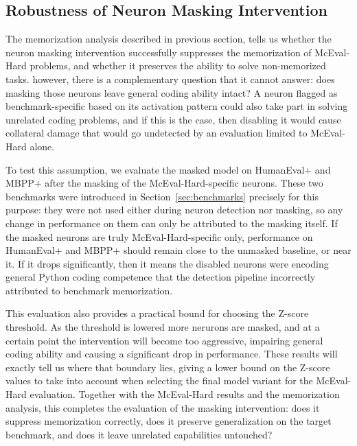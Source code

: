 \documentclass[mscthesis]{usiinfthesis}
\begin{document}
\subsection{Robustness of Neuron Masking Intervention}
\label{sec:robustness_design}
The memorization analysis described in previous section, tells us whether the neuron masking intervention successfully suppresses the memorization of McEval-Hard problems, and whether it preserves the ability to solve non-memorized tasks.
however, there is a complementary question that it cannot answer: does masking those neurons leave general coding ability intact? 
A neuron flagged as benchmark-specific based on its activation pattern could also take part in solving unrelated coding problems, and if this is the case, then disabling it would cause collateral damage that would go undetected by an evaluation limited to McEval-Hard alone.
\par\vspace{1em}
To test this assumption, we evaluate the masked model on HumanEval+ and
MBPP+ after the masking of the McEval-Hard-specific neurons. 
These two benchmarks were introduced in Section~\ref{sec:benchmarks} precisely for this purpose:
they were not used either during neuron detection nor masking, so any change in performance on them can only be attributed
to the masking itself. 
If the masked neurons are truly McEval-Hard-specific only, performance on HumanEval+
and MBPP+ should remain close to the unmasked baseline, or near it. If it drops significantly, then
it means the disabled neurons were encoding general Python coding competence that the detection pipeline incorrectly attributed to benchmark memorization.
\par\vspace{1em}
This evaluation also provides a practical bound for choosing the Z-score threshold. 
As the threshold is lowered more nerurons are masked, and at a certain point the intervention will become too aggressive, impairing general coding ability and causing a significant drop in performance.
These results will exactly tell us where that boundary lies, giving a lower bound on the Z-score values to take into account when selecting the final model variant for the McEval-Hard evaluation.
Together with the McEval-Hard results and the memorization analysis, this
completes the evaluation of the masking intervention: does it suppress memorization correctly, does it preserve generalization on the target benchmark, and does it leave unrelated capabilities untouched?
\end{document}

